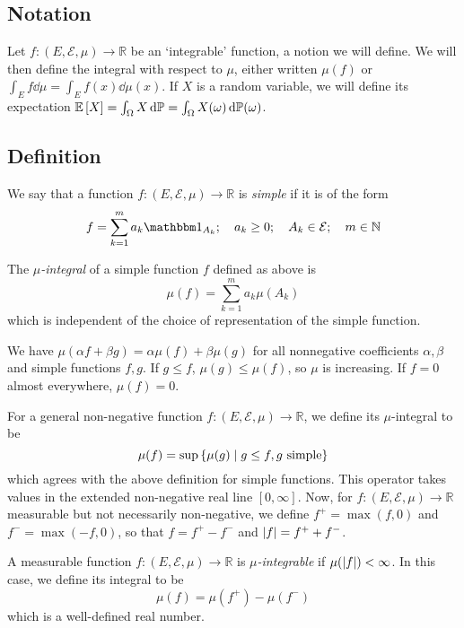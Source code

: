 \subsection{Notation}
Let \( f \colon (E, \mathcal E, \mu) \to \mathbb R \) be an `integrable' function, a notion we will define.
We will then define the integral with respect to \( \mu \), either written \( \mu(f) \) or \( \int_E f \dd{\mu} = \int_E f(x) \dd{\mu(x)} \).
If \( X \) is a random variable, we will define its expectation \( \mathbb{E}\left[{X}\right] = \int_\Omega X \dd{\mathbb P} = \int_\Omega X(\omega) \dd{\mathbb P(\omega)} \).

\subsection{Definition}
We say that a function \( f \colon (E,\mathcal E,\mu) \to \mathbb R \) is \emph{simple} if it is of the form
\[ f = \sum_{k=1}^m a_k \mathbbm 1_{A_k};\quad a_k \geq 0;\quad A_k \in \mathcal E;\quad m \in \mathbb N \]
\begin{definition}
	The \emph{\( \mu \)-integral} of a simple function \( f \) defined as above is
	\[ \mu(f) = \sum_{k=1}^m a_k \mu(A_k) \]
	which is independent of the choice of representation of the simple function.
\end{definition}
\begin{remark}
	We have \( \mu(\alpha f + \beta g) = \alpha \mu(f) + \beta \mu(g) \) for all nonnegative coefficients \( \alpha, \beta \) and simple functions \( f, g \).
	If \( g \leq f \), \( \mu(g) \leq \mu(f) \), so \( \mu \) is increasing.
	If \( f = 0 \) almost everywhere, \( \mu(f) = 0 \).
\end{remark}
For a general non-negative function \( f \colon (E,\mathcal E,\mu) \to \mathbb R \), we define its \( \mu \)-integral to be
\[ \mu(f) = \sup\qty{\mu(g) \mid g \leq f, g \text{ simple}} \]
which agrees with the above definition for simple functions.
This operator takes values in the extended non-negative real line \( [0,\infty] \).
Now, for \( f \colon (E,\mathcal E,\mu) \to \mathbb R \) measurable but not necessarily non-negative, we define \( f^+ = \max(f,0) \) and \( f^- = \max(-f,0) \), so that \( f = f^+ - f^- \) and \( \abs{f} = f^+ + f^- \).
\begin{definition}
	A measurable function \( f \colon (E,\mathcal E,\mu) \to \mathbb R \) is \emph{\( \mu \)-integrable} if \( \mu(\abs{f}) < \infty \).
	In this case, we define its integral to be
	\[ \mu(f) = \mu(f^+) - \mu(f^-) \]
	which is a well-defined real number.
\end{definition}

